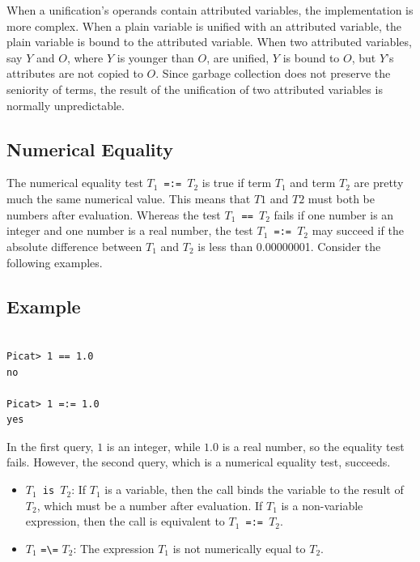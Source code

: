 When a unification's operands contain attributed variables, the implementation is more complex. When a plain variable is unified with an attributed variable, the plain variable is bound to the attributed variable. When two attributed variables, say $Y$ and $O$, where $Y$ is younger than $O$, are unified,  $Y$ is bound to $O$, but $Y$'s attributes are not copied to $O$. Since garbage collection does not preserve the seniority of terms, the result of the unification of two attributed variables is normally unpredictable.

\subsection{Numerical Equality}
The numerical equality test \texttt{$T_1$ =:= $T_2$} is true if term $T_1$ and term $T_2$ are pretty much the same numerical value.  This means that $T1$ and $T2$ must both be numbers after evaluation.  Whereas the test \texttt{$T_1$ == $T_2$} fails if one number is an integer and one number is a real number, the test \texttt{$T_1$ =:= $T_2$} may succeed if the absolute difference between $T_1$ and $T_2$ is less than 0.00000001.  Consider the following examples.
\subsection*{Example}

\begin{verbatim}
    
Picat> 1 == 1.0
no

Picat> 1 =:= 1.0
yes
\end{verbatim}
In the first query, $1$ is an integer, while $1.0$ is a real number, so the equality test fails.  However, the second query, which is a numerical equality test, succeeds.  

\begin{itemize}
\item \texttt{$T_1$ is $T_2$}: If \texttt{$T_1$} is a variable, then the call binds the variable to the result of \texttt{$T_2$}, which must be a number after evaluation. If \texttt{$T_1$} is a non-variable expression, then the call is equivalent to \texttt{$T_1$ =:= $T_2$}.

\item $T_1$ \verb+=\=+ $T_2$: The expression \texttt{$T_1$} is not numerically equal to \texttt{$T_2$}.
\end{itemize}

